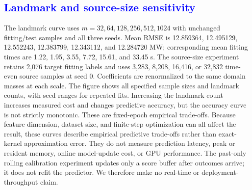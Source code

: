 \FloatBarrier

\subsection{\textcolor{blue}{Landmark and source-size sensitivity}}
{\color{blue}The landmark curve uses $m=32,64,128,256,512,1024$ with unchanged fitting/test samples and all three seeds. Mean RMSE is 12.859364, 12.495129, 12.552243, 12.383799, 12.343112, and 12.284720 MW; corresponding mean fitting times are 1.22, 1.95, 3.55, 7.72, 15.61, and 33.45 s. The source-size experiment retains 2,076 target fitting labels and uses 3,283, 8,208, 16,416, or 32,832 time-even source samples at seed 0. Coefficients are renormalized to the same domain masses at each scale. The figure shows all specified sample sizes and landmark counts, with seed ranges for repeated fits. Increasing the landmark count increases measured cost and changes predictive accuracy, but the accuracy curve is not strictly monotonic. These are fixed-epoch empirical trade-offs. Because feature dimension, dataset size, and finite-step optimization can all affect the result, these curves describe empirical predictive trade-offs rather than exact-kernel approximation error. They do not measure prediction latency, peak or resident memory, online model-update cost, or GPU performance. The past-only rolling calibration experiment updates only a score buffer after outcomes arrive; it does not refit the predictor. We therefore make no real-time or deployment-throughput claim.}

\begin{table}[pos=htbp]
\centering
\color{blue}
\small
\caption{\textcolor{blue}{Accuracy--runtime trade-off with fixed training and test data; seed mean [minimum, maximum]. Time covers solver fitting only.}}
\label{tab:chronological_landmarks}
\end{table}

